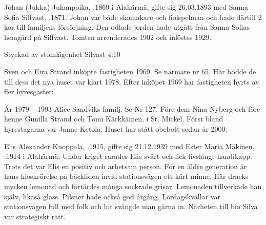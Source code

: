 %
Johan (Jukka) Juhanpoika, .1869 i Alahärmä, gifte sig 26.03.1893 med Sanna Sofia Silfvast, .1871. Johan var både skomakare och fiolspelman och hade därtill 2 kor till familjens försörjning. Den odlade jorden hade utgått från Sanna Sofias hemgård på Silfvast. Tomten arrenderades 1902 och inlöstes 1929.
\begin{jhchildren}
  \item {}
  \item {}
  \item {}
  \item {}
  \item {}
  \item {}
\end{jhchildren}



%

Styckad av stomlägenhet Silvast 4:10

%
Sven och Eira Strand inköpte fastigheten 1969. Se närmare nr 65. Här bodde de till dess det nya huset var klart 1978. Efter inköpet 1969 har fastigheten hyrts av fler hyresgäster:

År 1979 – 1993  Alice Sandviks familj. Se Nr 127. Före dem Nina Nyberg och före henne Gunilla Strand och Tomi Kärkkäinen,  i St. Mickel. Först bland hyrestagarna var Janne Ketola. Huset har stått obebott sedan år 2000.



%
Elis Alexander Kuoppala, .1915, gifte sig 21.12.1939 med Ester Maria Mäkinen, .1914 i Alahärmä. Under kriget sårades Elis svårt och fick livslångt handikapp. Trots det var Elis en positiv och arbetsam person. För en äldre generation är hans kioskrörelse på bäckliden invid stationsvägen ett kärt minne. Här dracks mycken lemonad och förtärdes många sockrade grisar. Lemonaden tillverkade han själv, likaså glass. Pilsner hade också god åtgång. Lördagskvällar var stationsvägen full med folk och hit svängde man gärna in. Närheten till bio Silva var strategiskt rätt.


